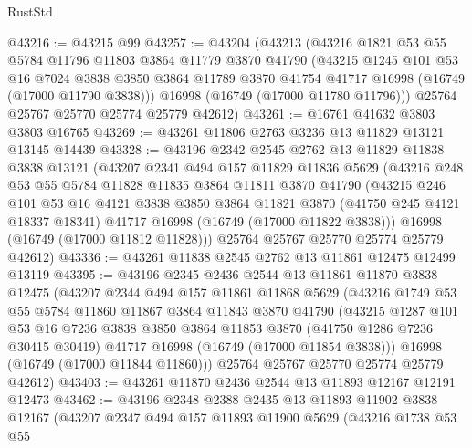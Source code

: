\begin{lexlean}{RustStd}
\begin{coremodule}
@43216 := @43215 @99
@43257 := @43204
    (@43213
      (@43216
        @1821
        @53
        @55
        @5784
        @11796
        @11803
        @3864
        @11779
        @3870
        @41790
        (@43215
          @1245
          @101
          @53
          @16
          @7024
          @3838
          @3850
          @3864
          @11789
          @3870
          @41754
          @41717
          @16998
          (@16749 (@17000 @11790 @3838)))
        @16998
        (@16749 (@17000 @11780 @11796)))
      @25764
      @25767
      @25770
      @25774
      @25779
      @42612)
@43261 := @16761 @41632 @3803 @3803 @16765
@43269 := @43261 @11806 @2763 @3236 @13 @11829 @13121 @13145 @14439
@43328 := @43196
    @2342
    @2545
    @2762
    @13
    @11829
    @11838
    @3838
    @13121
    (@43207
      @2341
      @494
      @157
      @11829
      @11836
      @5629
      (@43216
        @248
        @53
        @55
        @5784
        @11828
        @11835
        @3864
        @11811
        @3870
        @41790
        (@43215
          @246
          @101
          @53
          @16
          @4121
          @3838
          @3850
          @3864
          @11821
          @3870
          (@41750 @245 @4121 @18337 @18341)
          @41717
          @16998
          (@16749 (@17000 @11822 @3838)))
        @16998
        (@16749 (@17000 @11812 @11828)))
      @25764
      @25767
      @25770
      @25774
      @25779
      @42612)
@43336 := @43261 @11838 @2545 @2762 @13 @11861 @12475 @12499 @13119
@43395 := @43196
    @2345
    @2436
    @2544
    @13
    @11861
    @11870
    @3838
    @12475
    (@43207
      @2344
      @494
      @157
      @11861
      @11868
      @5629
      (@43216
        @1749
        @53
        @55
        @5784
        @11860
        @11867
        @3864
        @11843
        @3870
        @41790
        (@43215
          @1287
          @101
          @53
          @16
          @7236
          @3838
          @3850
          @3864
          @11853
          @3870
          (@41750 @1286 @7236 @30415 @30419)
          @41717
          @16998
          (@16749 (@17000 @11854 @3838)))
        @16998
        (@16749 (@17000 @11844 @11860)))
      @25764
      @25767
      @25770
      @25774
      @25779
      @42612)
@43403 := @43261 @11870 @2436 @2544 @13 @11893 @12167 @12191 @12473
@43462 := @43196
    @2348
    @2388
    @2435
    @13
    @11893
    @11902
    @3838
    @12167
    (@43207
      @2347
      @494
      @157
      @11893
      @11900
      @5629
      (@43216
        @1738
        @53
        @55

\end{coremodule}
\end{lexlean}
